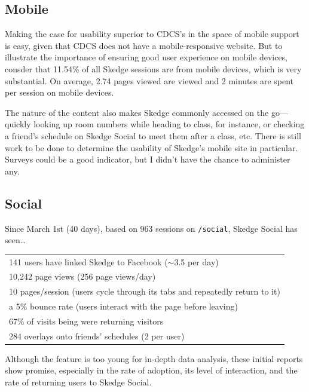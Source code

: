 {\subsection{Mobile}

Making the case for usability superior to CDCS's in the space of mobile support is easy, given that CDCS does not have a mobile-responsive website. But to illustrate the importance of ensuring good user experience on mobile devices, consder that 11.54\% of all Skedge sessions are from mobile devices, which is very substantial. On average, 2.74 pages viewed are viewed and 2 minutes are spent per session on mobile devices.

The nature of the content also makes Skedge commonly accessed on the go---quickly looking up room numbers while heading to class, for instance, or checking a friend's schedule on Skedge Social to meet them after a class, etc. There is still work to be done to determine the usability of Skedge's mobile site in particular. Surveys could be a good indicator, but I didn't have the chance to administer any.

\subsection{Social}

Since March 1st (40 days), based on 963 sessions on {\tt /social}, Skedge Social has seen\ldots

{\renewcommand{\arraystretch}{1.5}
\singlespacing
\begin{center}
\begin{tabular}{l}
  \hline
  141 users have linked Skedge to Facebook ($\sim$3.5 per day) \\
  10,242 page views (256 page views/day)  \\
  10 pages/session (users cycle through its tabs and repeatedly return to it) \\
  a 5\% bounce rate (users interact with the page before leaving) \\
  67\% of visits being were returning visitors \\
  284 overlays onto friends’ schedules (2 per user) \\
  \hline
\end{tabular}
\end{center}
\doublespacing

\vspace{5pt}

\noindent Although the feature is too young for in-depth data analysis, these initial reports show promise, especially in the rate of adoption, its level of interaction, and the rate of returning users to Skedge Social.

}}
